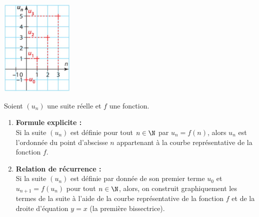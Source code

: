 \documentclass[a4paper,11pt,cours]{nsi} %
\begin{document}

\begin{exemple}[]
    {\includegraphics[width=3.5cm]{graphique1.jpg}}
\end{exemple}

\begin{propriete}[s]
    Soient $(u_n)$ une suite réelle et $f$ une fonction.
    \begin{enumerate}[label=\textbullet]
        \item \textbf{Formule explicite :}\\
        Si la suite $(u_n)$ est définie pour tout $n\in\N$ par $u_n=f(n)$, alors $u_n$ est l'ordonnée du point d'abscisse $n$ appartenant à la courbe représentative de la fonction $f$.
        \item \textbf{Relation de récurrence :}\\
        Si la suite $(u_n)$ est définie par donnée de son premier terme $u_0$ et $u_{n+1}=f(u_n)$ pour tout $n\in\N$, alors, on construit graphiquement les termes de la suite à l'aide de la courbe représentative de la fonction $f$ et de la droite d'équation $y=x$ (la première bissectrice).
    \end{enumerate}
\end{propriete}

\setlength{\columnseprule}{0.1pt}
\end{document}
